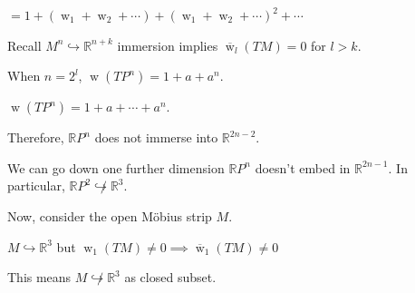 \documentclass{article}
\theoremstyle{definition}
\begin{document}
    \(= 1 + (\operatorname{w}_1 + \operatorname{w}_2 + \cdots) + (\operatorname{w}_1 + \operatorname{w}_2 + \cdots)^2 + \cdots\)

    Recall \(M^n \hookrightarrow \mathbb{R}^{n+k}\) immersion implies \(\overline{\operatorname{w}}_l(TM) = 0\) for \(l > k\).

    When \(n = 2^l\), \(\operatorname{w}(TP^n) = 1 + a + a^n\).
    
    \(\operatorname{w}(TP^n) = 1 + a + \cdots + a^n\).

    Therefore, \(\mathbb{R}P^n\) does not immerse into \(\mathbb{R}^{2n - 2}\).
    
    We can go down one further dimension \(\mathbb{R}P^n\) doesn't embed in \(\mathbb{R}^{2n-1}\). In particular, \(\mathbb{R}P^2 \not \hookrightarrow \mathbb{R}^3\).

    Now, consider the open M\"obius strip \(M\).

    \(M \hookrightarrow \mathbb{R}^3\) but \(\operatorname{w}_1 (TM) \neq 0 \implies \overline{\operatorname{w}}_1(TM) \neq 0\)

    This means \(M \not \hookrightarrow \mathbb{R}^3\) as closed subset.
\end{document}
